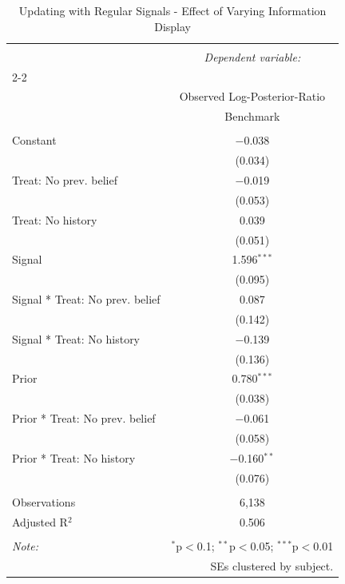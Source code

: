
\begin{table}[!htbp] \centering 
  \caption{Updating with Regular Signals - Effect of Varying Information Display} 
  \label{} 
\begin{tabular}{@{\extracolsep{5pt}}lc} 
\\[-1.8ex]\hline 
\hline \\[-1.8ex] 
 & \multicolumn{1}{c}{\textit{Dependent variable:}} \\ 
\cline{2-2} 
\\[-1.8ex] & Observed Log-Posterior-Ratio \\ 
 & Benchmark \\ 
\hline \\[-1.8ex] 
 Constant & $-$0.038 \\ 
  & (0.034) \\ 
  Treat: No prev. belief & $-$0.019 \\ 
  & (0.053) \\ 
  Treat: No history & 0.039 \\ 
  & (0.051) \\ 
  Signal & 1.596$^{***}$ \\ 
  & (0.095) \\ 
  Signal * Treat: No prev. belief & 0.087 \\ 
  & (0.142) \\ 
  Signal * Treat: No history & $-$0.139 \\ 
  & (0.136) \\ 
  Prior & 0.780$^{***}$ \\ 
  & (0.038) \\ 
  Prior * Treat: No prev. belief & $-$0.061 \\ 
  & (0.058) \\ 
  Prior * Treat: No history & $-$0.160$^{**}$ \\ 
  & (0.076) \\ 
 \hline \\[-1.8ex] 
Observations & 6,138 \\ 
Adjusted R$^{2}$ & 0.506 \\ 
\hline 
\hline \\[-1.8ex] 
\textit{Note:}  & \multicolumn{1}{r}{$^{*}$p$<$0.1; $^{**}$p$<$0.05; $^{***}$p$<$0.01} \\ 
 & \multicolumn{1}{r}{SEs clustered by subject.} \\ 
\end{tabular} 
\end{table} 
